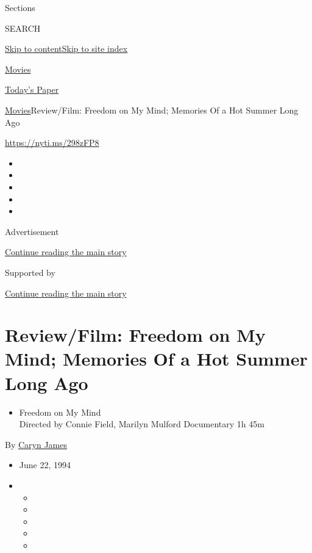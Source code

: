 Sections

SEARCH

\protect\hyperlink{site-content}{Skip to
content}\protect\hyperlink{site-index}{Skip to site index}

\href{https://www.nytimes.com/section/movies}{Movies}

\href{https://myaccount.nytimes.com/auth/login?response_type=cookie\&client_id=vi}{}

\href{https://www.nytimes.com/section/todayspaper}{Today's Paper}

\href{/section/movies}{Movies}\textbar{}Review/Film: Freedom on My Mind;
Memories Of a Hot Summer Long Ago

\href{https://nyti.ms/298zFP8}{https://nyti.ms/298zFP8}

\begin{itemize}
\item
\item
\item
\item
\item
\end{itemize}

Advertisement

\protect\hyperlink{after-top}{Continue reading the main story}

Supported by

\protect\hyperlink{after-sponsor}{Continue reading the main story}

\hypertarget{reviewfilm-freedom-on-my-mind-memories-of-a-hot-summer-long-ago}{%
\section{Review/Film: Freedom on My Mind; Memories Of a Hot Summer Long
Ago}\label{reviewfilm-freedom-on-my-mind-memories-of-a-hot-summer-long-ago}}

\begin{itemize}
\tightlist
\item
  Freedom on My Mind\\
  Directed by Connie Field, Marilyn Mulford Documentary 1h 45m
\end{itemize}

By \href{https://www.nytimes.com/by/caryn-james}{Caryn James}

\begin{itemize}
\item
  June 22, 1994
\item
  \begin{itemize}
  \item
  \item
  \item
  \item
  \item
  \end{itemize}
\end{itemize}

